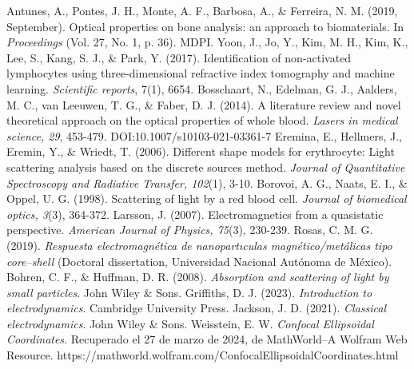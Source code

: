 \documentclass[paper=letter,8.5pt]{article}
\begin{document}





















\begin{thebibliography}{99}
 Antunes, A., Pontes, J. H., Monte, A. F., Barbosa, A., \& Ferreira, N. M. (2019, September). Optical properties on bone analysis: an approach to biomaterials. In \textit{Proceedings} (Vol. 27, No. 1, p. 36). MDPI.
 Yoon, J., Jo, Y., Kim, M. H., Kim, K., Lee, S., Kang, S. J., \& Park, Y. (2017). Identification of non-activated lymphocytes using three-dimensional refractive index tomography and machine learning. \textit{Scientific reports}, 7(1), 6654.
 Bosschaart, N., Edelman, G. J., Aalders, M. C., van Leeuwen, T. G., \& Faber, D. J. (2014). A literature review and novel theoretical approach on the optical properties of whole blood.\textit{ Lasers in medical science, 29}, 453-479. DOI:10.1007/s10103-021-03361-7
 Eremina, E., Hellmers, J., Eremin, Y., \& Wriedt, T. (2006). Different shape models for erythrocyte: Light scattering analysis based on the discrete sources method. \textit{Journal of Quantitative Spectroscopy and Radiative Transfer, 102}(1), 3-10.
 Borovoi, A. G., Naats, E. I., \& Oppel, U. G. (1998). Scattering of light by a red blood cell. \textit{Journal of biomedical optics, 3}(3), 364-372.
 Larsson, J. (2007). Electromagnetics from a quasistatic perspective. \textit{American Journal of Physics, 75}(3), 230-239.
 Rosas, C. M. G. (2019). \textit{Respuesta electromagnética de nanopartıculas magnético/metálicas tipo core–shell} (Doctoral dissertation, Universidad Nacional Autónoma de México).
 Bohren, C. F., \& Huffman, D. R. (2008). \textit{Absorption and scattering of light by small particles}. John Wiley \& Sons.
Griffiths, D. J. (2023). \textit{Introduction to electrodynamics}. Cambridge University Press.
 Jackson, J. D. (2021). \textit{Classical electrodynamics}. John Wiley \& Sons.
 Weisstein, E. W. \textit{Confocal Ellipsoidal Coordinates}. Recuperado el 27 de marzo de 2024, de MathWorld--A Wolfram Web Resource. https://mathworld.wolfram.com/ConfocalEllipsoidalCoordinates.html

\end{thebibliography}
\end{document}
